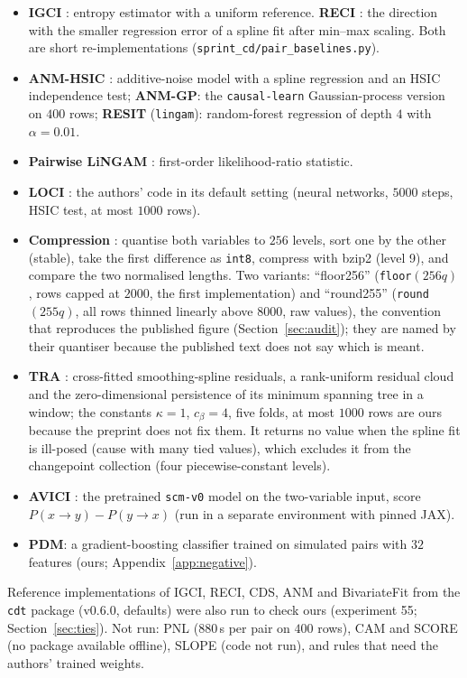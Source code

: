 \begin{itemize}
\item \textbf{IGCI} \citep{daniusis2010inferring}: entropy estimator with a uniform reference. \textbf{RECI} \citep{blobaum2018cause}: the direction with the smaller regression error of a spline fit after min--max scaling. Both are short re-implementations (\texttt{sprint\_cd/\allowbreak pair\_baselines.py}).
\item \textbf{ANM-HSIC} \citep{hoyer2009nonlinear}: additive-noise model with a spline regression and an HSIC independence test; \textbf{ANM-GP}: the \texttt{causal-learn} Gaussian-process version on $400$ rows; \textbf{RESIT} (\texttt{lingam}): random-forest regression of depth $4$ with $\alpha=0.01$.
\item \textbf{Pairwise LiNGAM} \citep{hyvarinen2013pairwise}: first-order likelihood-ratio statistic.
\item \textbf{LOCI} \citep{immer2023loci}: the authors' code in its default setting (neural networks, $5000$ steps, HSIC test, at most $1000$ rows).
\item \textbf{Compression} \citep{stienstra2026oneruler}: quantise both variables to $256$ levels, sort one by the other (stable), take the first difference as \texttt{int8}, compress with bzip2 (level 9), and compare the two normalised lengths. Two variants: ``floor256'' (\texttt{floor}$(256q)$, rows capped at $2000$, the first implementation) and ``round255'' (\texttt{round}$(255q)$, all rows thinned linearly above $8000$, raw values), the convention that reproduces the published figure (Section~\ref{sec:audit}); they are named by their quantiser because the published text does not say which is meant.
\item \textbf{TRA} \citep{elbouchattaoui2026tra}: cross-fitted smoothing-spline residuals, a rank-uniform residual cloud and the zero-dimensional persistence of its minimum spanning tree in a window; the constants $\kappa=1$, $c_\beta=4$, five folds, at most $1000$ rows are ours because the preprint does not fix them. It returns no value when the spline fit is ill-posed (cause with many tied values), which excludes it from the changepoint collection (four piecewise-constant levels).
\item \textbf{AVICI} \citep{lorch2022amortized}: the pretrained \texttt{scm-v0} model on the two-variable input, score $P(x\to y)-P(y\to x)$ (run in a separate environment with pinned JAX).
\item \textbf{PDM}: a gradient-boosting classifier trained on simulated pairs with $32$ features (ours; Appendix~\ref{app:negative}).
\end{itemize}
Reference implementations of IGCI, RECI, CDS, ANM and BivariateFit from the \texttt{cdt} package (v0.6.0, defaults) were also run to check ours (experiment 55; Section~\ref{sec:ties}). Not run: PNL (880\,s per pair on $400$ rows), CAM and SCORE (no package available offline), SLOPE (code not run), and rules that need the authors' trained weights.

